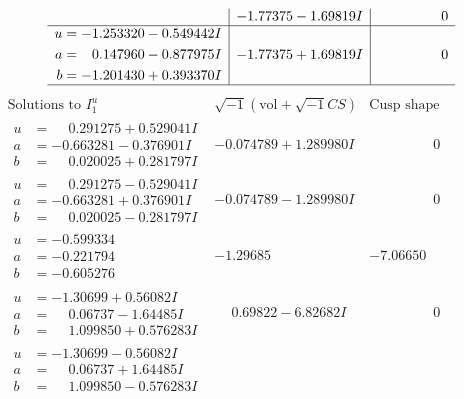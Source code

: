 \documentclass[1p]{elsarticle_modified}
\theoremstyle{definition}
\newcommand{\I}{\sqrt{-1}}
\begin{document}
$$\begin{array}{c|c|c}
 & -1.77375 - 1.69819 I & \phantom{-0.000000 } 0 \\ \hline\begin{aligned}
u &= -1.253320 - 0.549442 I \\
a &= \phantom{-}0.147960 - 0.877975 I \\
b &= -1.201430 + 0.393370 I\end{aligned}
 & -1.77375 + 1.69819 I & \phantom{-0.000000 } 0\\
 \hline 
 \end{array}$$\newpage$$\begin{array}{c|c|c}  
\text{Solutions to }I^u_{1}& \I (\text{vol} + \sqrt{-1}CS) & \text{Cusp shape}\\
 \hline 
\begin{aligned}
u &= \phantom{-}0.291275 + 0.529041 I \\
a &= -0.663281 - 0.376901 I \\
b &= \phantom{-}0.020025 + 0.281797 I\end{aligned}
 & -0.074789 + 1.289980 I & \phantom{-0.000000 } 0 \\ \hline\begin{aligned}
u &= \phantom{-}0.291275 - 0.529041 I \\
a &= -0.663281 + 0.376901 I \\
b &= \phantom{-}0.020025 - 0.281797 I\end{aligned}
 & -0.074789 - 1.289980 I & \phantom{-0.000000 } 0 \\ \hline\begin{aligned}
u &= -0.599334\phantom{ +0.000000I} \\
a &= -0.221794\phantom{ +0.000000I} \\
b &= -0.605276\phantom{ +0.000000I}\end{aligned}
 & -1.29685\phantom{ +0.000000I} & -7.06650\phantom{ +0.000000I} \\ \hline\begin{aligned}
u &= -1.30699 + 0.56082 I \\
a &= \phantom{-}0.06737 - 1.64485 I \\
b &= \phantom{-}1.099850 + 0.576283 I\end{aligned}
 & \phantom{-}0.69822 - 6.82682 I & \phantom{-0.000000 } 0 \\ \hline\begin{aligned}
u &= -1.30699 - 0.56082 I \\
a &= \phantom{-}0.06737 + 1.64485 I \\
b &= \phantom{-}1.099850 - 0.576283 I\end{aligned}

\end{array}$$
\end{document}

